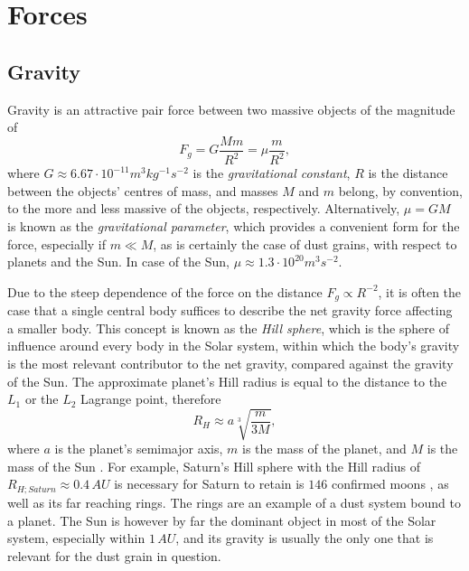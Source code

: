 \section{Forces} 

\subsection{Gravity} \label{ch:gravity}

Gravity is an attractive pair force between two massive objects of the magnitude of 
\begin{equation}
    F_g = G \frac{M m}{R^2} = \mu \frac{m}{R^2},
\end{equation}
where $G \approx 6.67 \cdot 10^{-11} m^3 kg^{-1} s^{-2}$ is the \textit{gravitational constant}, $R$ is the distance between the objects' centres of mass, and masses $M$ and $m$ belong, by convention, to the more and less massive of the objects, respectively. Alternatively, $\mu = G M$ is known as the \textit{gravitational parameter}, which provides a convenient form for the force, especially if $m \ll M$, as is certainly the case of dust grains, with respect to planets and the Sun. In case of the Sun, $\mu \approx 1.3 \cdot 10^{20} \si{m^3 s^{-2}}$.

Due to the steep dependence of the force on the distance $F_g \propto R^{-2}$, it is often the case that a single central body suffices to describe the net gravity force affecting a smaller body. This concept is known as the \textit{Hill sphere}, which is the sphere of influence around every body in the Solar system, within which the body's gravity is the most relevant contributor to the net gravity, compared against the gravity of the Sun. The approximate planet's Hill radius is equal to the distance to the $L_1$ or the $L_2$ Lagrange point, therefore 
\begin{equation}
    R_H \approx a \sqrt[3]{\frac{m}{3M}},
\end{equation}
where $a$ is the planet's semimajor axis, $m$ is the mass of the planet, and $M$ is the mass of the Sun \cite{sheppard2023new}. For example, Saturn's Hill sphere with the Hill radius of $R_{H;Saturn} \approx 0.4 \, \si{AU}$ is necessary for Saturn to retain is $146$ confirmed moons \citep{sheppard2023new}, as well as its far reaching rings. The rings are an example of a dust system bound to a planet. The Sun is however by far the dominant object in most of the Solar system, especially within $1 \, \si{AU}$, and its gravity is usually the only one that is relevant for the dust grain in question.


